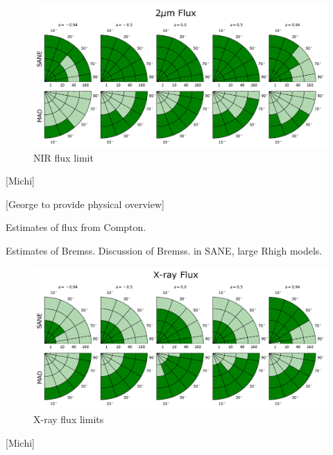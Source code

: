 
\begin{figure}
  \centering
  \includegraphics[width=\columnwidth]{./figures/2um_flux.png}
  \caption{NIR flux limit}
  \label{fig:cmp_2um_flux}
\end{figure}

[Michi]


[George to provide physical overview]

Estimates of flux from Compton.

Estimates of Bremss.  Discussion of Bremss. in SANE, large Rhigh models.

\begin{figure}
  \centering
  \includegraphics[width=\columnwidth]{./figures/Xray_flux.png}
  \caption{X-ray flux limits}
  \label{fig:cmp_xray_flux}
\end{figure}

[Michi]


